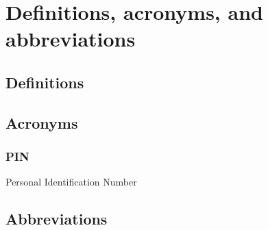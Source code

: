 \section{Definitions, acronyms, and abbreviations}

\subsection{Definitions}
\subsection{Acronyms}
	\subsubsection{PIN}
	Personal Identification Number
\subsection{Abbreviations}